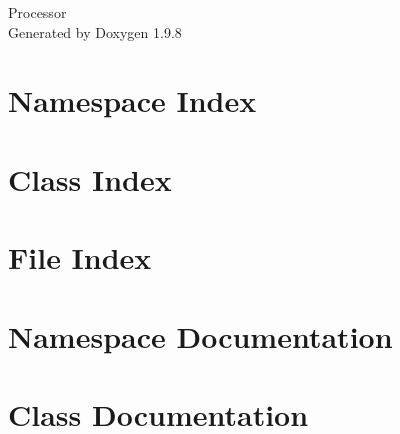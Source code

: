 \documentclass[twoside]{book}
\newcommand{\+}{\discretionary{\mbox{\scriptsize$\hookleftarrow$}}{}{}}
\newcommand{\clearemptydoublepage}{%
    \newpage{\pagestyle{empty}\cleardoublepage}%
  }
\begin{document}
  \raggedbottom
    \hypersetup{pageanchor=false,
                bookmarksnumbered=true,
                pdfencoding=unicode
               }
  \begin{titlepage}
  \vspace*{7cm}
  \begin{center}%
  {\Large Processor}\\
  \vspace*{1cm}
  {\large Generated by Doxygen 1.9.8}\\
  \end{center}
  \end{titlepage}
  \clearemptydoublepage
  \tableofcontents
  \clearemptydoublepage
  \hypersetup{pageanchor=true}

\chapter{Namespace Index}

\chapter{Class Index}

\chapter{File Index}

\chapter{Namespace Documentation}




\chapter{Class Documentation}























\end{document}
